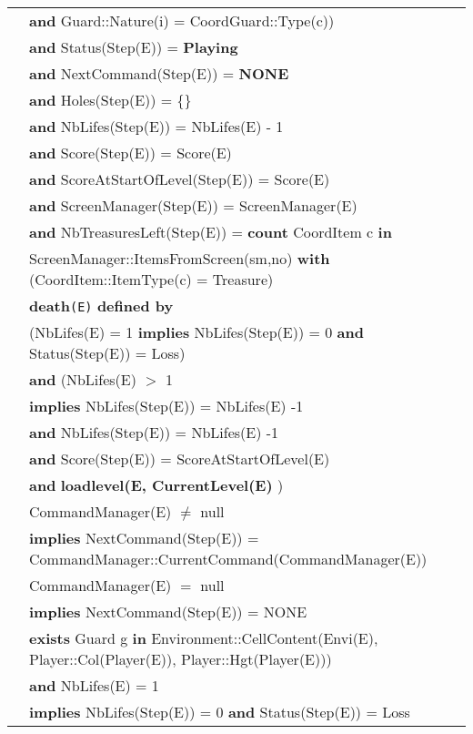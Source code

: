 \documentclass[7pt]{article}
\begin{document}
\begin{tabular}{rl}
& \quad\quad\quad\quad\quad\quad\quad\quad \textbf{and} Guard::Nature(i) = CoordGuard::Type(c)) \\
& \quad\quad \textbf{and} Status(Step(E)) = \textbf{Playing} \\
& \quad\quad \textbf{and} NextCommand(Step(E)) = \textbf{NONE} \\
& \quad\quad \textbf{and} Holes(Step(E)) = \{\} \\
& \quad\quad \textbf{and} NbLifes(Step(E)) = NbLifes(E) - 1 \\
& \quad\quad \textbf{and} Score(Step(E)) = Score(E) \\
& \quad\quad \textbf{and} ScoreAtStartOfLevel(Step(E)) = Score(E) \\
& \quad\quad \textbf{and} ScreenManager(Step(E)) = ScreenManager(E)  \\
& \quad\quad \textbf{and} NbTreasuresLeft(Step(E)) = \textbf{count} CoordItem c \textbf{in} \\
& \quad\quad \quad ScreenManager::ItemsFromScreen(sm,no) \textbf{with} (CoordItem::ItemType(c) = Treasure) 
 \\
 & \textbf{death}\texttt{(E)} \textbf{defined by} \\ 
 & \quad (NbLifes(E) = 1 \textbf{implies} NbLifes(Step(E)) = 0 \textbf{and} Status(Step(E)) = Loss) \\
 & \quad \textbf{and} (NbLifes(E) $>$ 1 \\
 & \quad\quad\quad \textbf{implies} NbLifes(Step(E)) = NbLifes(E) -1 \\
 & \quad\quad\quad\quad\quad\textbf{and} NbLifes(Step(E)) = NbLifes(E) -1  \\
 & \quad\quad\quad\quad\quad\textbf{and} Score(Step(E)) = ScoreAtStartOfLevel(E)  \\
 & \quad\quad\quad\quad\quad\textbf{and} \textbf{loadlevel(E, CurrentLevel(E)} ) \\
 
 & CommandManager(E) $\neq$ null \\
 & \quad \textbf{implies} NextCommand(Step(E)) = CommandManager::CurrentCommand(CommandManager(E)) \\
 
 & CommandManager(E) $=$ null \\
 & \quad \textbf{implies} NextCommand(Step(E)) = NONE \\

& \textbf{exists} Guard g \textbf{in} Environment::CellContent(Envi(E), Player::Col(Player(E)), Player::Hgt(Player(E))) \\
& \quad \textbf{and} NbLifes(E) = 1 \\
& \quad \textbf{implies} NbLifes(Step(E)) = 0 \textbf{and} Status(Step(E)) = Loss \\
   

\end{tabular}
\end{document}

